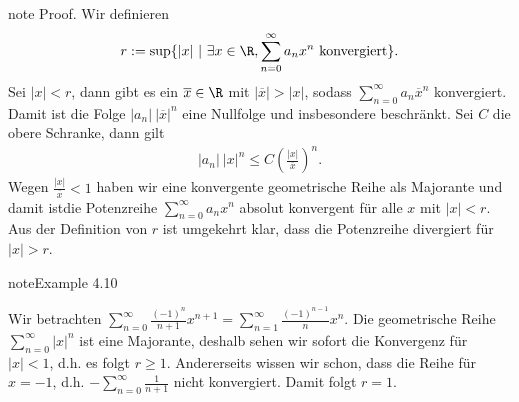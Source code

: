 \documentclass[letterpaper,10pt,english]{jupyterBook}
\begin{document}
\begin{sphinxadmonition}{note}
Proof.  Wir definieren
\begin{equation*}
\begin{split} r:= \sup\{ |x| ~|~ \exists x \in \R, \sum_{n=0}^\infty a_n x^n \text{ konvergiert} \}.\end{split}
\end{equation*}
Sei \(|x|<r\), dann gibt es ein \(\overline{x} \in \R\) mit \(|\overline{x}|>|x|\), sodass \(\sum_{n=0}^\infty a_n \overline{x}^n\) konvergiert. Damit ist die Folge \(|a_n|~ |\overline{x}|^n\) eine Nullfolge und insbesondere beschränkt. Sei \(C\) die obere Schranke, dann gilt
\begin{equation*}
\begin{split}|a_n|~ |x|^n \leq C \left( \frac{|x|}{\overline{x}} \right)^n.\end{split}
\end{equation*}
Wegen \(\frac{|x|}{\overline{x}} < 1\) haben wir eine konvergente geometrische Reihe als Majorante und damit istdie Potenzreihe \(\sum_{n=0}^\infty a_n x^n \) absolut konvergent für alle \(x\) mit \(|x|<r\).
Aus der Definition von  \(r\) ist umgekehrt klar, dass die Potenzreihe divergiert für \(|x|>r\).
\end{sphinxadmonition}
\label{metrik/potenzreihen:example-2}
\begin{sphinxadmonition}{note}{Example 4.10}



Wir betrachten \(\sum_{n=0}^\infty \frac{(-1)^{n}}{n+1}x^{n+1} = \sum_{n=1}^\infty \frac{(-1)^{n-1}}{n}x^{n}. \)
Die geometrische Reihe \(\sum_{n=0}^\infty |x|^n\) ist eine Majorante, deshalb sehen wir sofort die Konvergenz für \(|x| < 1\), d.h. es folgt \(r \geq 1\). Andererseits wissen wir schon, dass die Reihe für \(x=-1\), d.h. \(-
\sum_{n=0}^\infty \frac{1}{n+1}\) nicht konvergiert. Damit folgt \(r=1\).
\end{sphinxadmonition}
\end{document}
